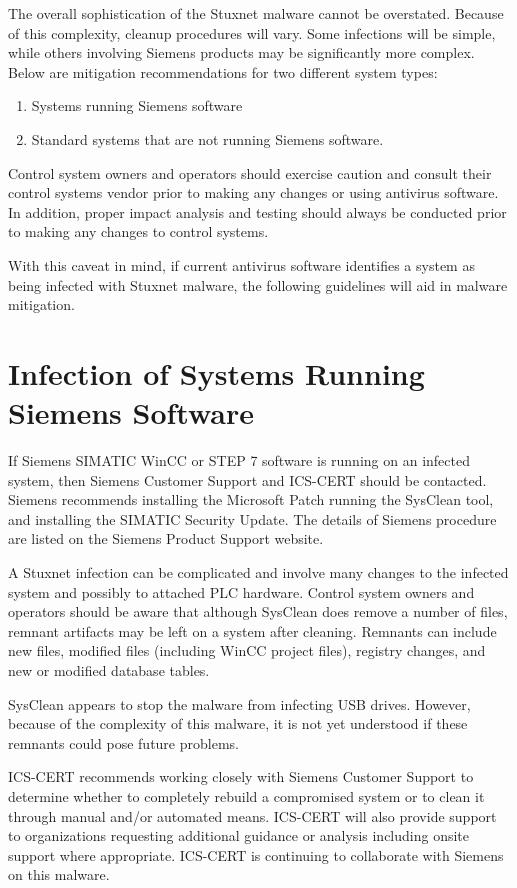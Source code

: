 \documentclass[10pt,twoside,openleft]{memoir}
\begin{document}
The overall sophistication of the Stuxnet malware cannot be overstated. Because of this complexity, cleanup procedures will vary. Some infections will be simple, while others involving Siemens products may be significantly more complex. Below are mitigation recommendations for two different system types:
\begin{enumerate}
 \item Systems running Siemens software
 \item Standard systems that are not running Siemens software.
\end{enumerate}
Control system owners and operators should exercise caution and consult their control systems vendor prior to making any changes or using antivirus software. In addition, proper impact analysis and testing should always be conducted prior to making any changes to control systems.

With this caveat in mind, if current antivirus software identifies a system as being infected with Stuxnet malware, the following guidelines will aid in malware mitigation.

\section{Infection of Systems Running Siemens Software}

If Siemens SIMATIC WinCC or STEP 7 software is running on an infected system, then Siemens Customer Support and ICS-CERT should be contacted. Siemens recommends installing the Microsoft Patch running the SysClean tool, and installing the SIMATIC Security Update. The details of Siemens procedure are listed on the Siemens Product Support website.

A Stuxnet infection can be complicated and involve many changes to the infected system and possibly to attached PLC hardware. Control system owners and operators should be aware that although SysClean does remove a number of files, remnant artifacts may be left on a system after cleaning. Remnants can include new files, modified files (including WinCC project files), registry changes, and new or modified database tables.

SysClean appears to stop the malware from infecting USB drives. However, because of the complexity of this malware, it is not yet understood if these remnants could pose future problems.

ICS-CERT recommends working closely with Siemens Customer Support to determine whether to completely rebuild a compromised system or to clean it through manual and/or automated means. ICS-CERT will also provide support to organizations requesting additional guidance or analysis including onsite support where appropriate. ICS-CERT is continuing to collaborate with Siemens on this malware.
\end{document}
